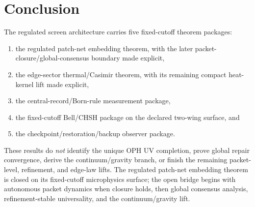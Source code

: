 \documentclass[11pt]{article}
\begin{document}
\section{Conclusion}

The regulated screen architecture carries five fixed-cutoff theorem packages:
\begin{enumerate}[leftmargin=2em]
\item the regulated patch-net embedding theorem, with the later packet-closure/global-consensus boundary made explicit,
\item the edge-sector thermal/Casimir theorem, with its remaining compact heat-kernel lift made explicit,
\item the central-record/Born-rule measurement package,
\item the fixed-cutoff Bell/CHSH package on the declared two-wing surface, and
\item the checkpoint/restoration/backup observer package.
\end{enumerate}

These results do \emph{not} identify the unique OPH UV completion, prove global repair
convergence, derive the continuum/gravity branch, or finish the remaining packet-level,
refinement, and edge-law lifts. The regulated patch-net embedding theorem is closed on its
fixed-cutoff microphysics surface; the open bridge begins with autonomous packet dynamics
when closure holds, then global consensus analysis, refinement-stable universality, and the
continuum/gravity lift.

\appendix

\end{document}
